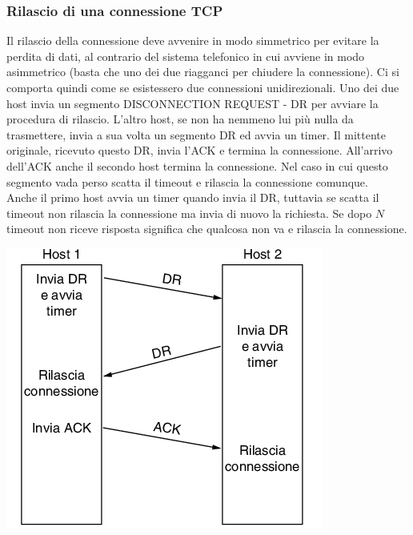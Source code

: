 \documentclass[10pt,a4paper,twoside]{article}
\begin{document}
\subsubsection{Rilascio di una connessione TCP}
\begin{minipage}{0.7\textwidth}
Il rilascio della connessione deve avvenire in modo simmetrico per evitare la perdita di dati, al contrario del sistema telefonico in cui avviene in modo asimmetrico (basta che uno dei due riagganci per chiudere la connessione). Ci si comporta quindi come se esistessero due connessioni unidirezionali. Uno dei due host invia un segmento DISCONNECTION REQUEST - DR per avviare la procedura di rilascio. L'altro host, se non ha nemmeno lui più nulla da trasmettere, invia a sua volta un segmento DR ed avvia un timer. Il mittente originale, ricevuto questo DR, invia l'ACK e termina la connessione. All'arrivo dell'ACK anche il secondo host termina la connessione. Nel caso in cui questo segmento vada perso scatta il timeout e rilascia la connessione comunque.\\
Anche il primo host avvia un timer quando invia il DR, tuttavia se scatta il timeout non rilascia la connessione ma invia di nuovo la richiesta. Se dopo $N$ timeout non riceve risposta significa che qualcosa non va e rilascia la connessione.
\end{minipage}
\begin{minipage}{0.3\textwidth}
\includegraphics[width=\textwidth]{images/rilascio_connessione.png}
\end{minipage}
\newpage
\end{document}
